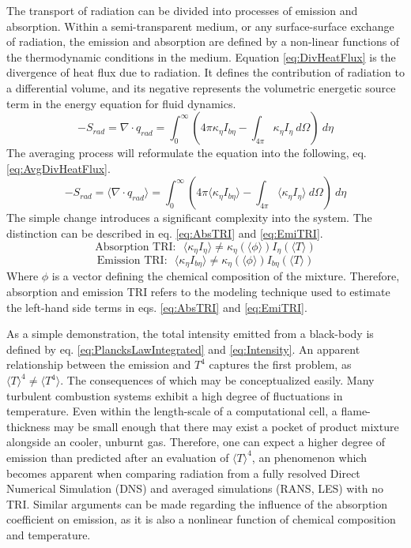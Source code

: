 The transport of radiation can be divided into processes of emission and absorption. 
Within a semi-transparent medium, or any surface-surface exchange of radiation, the emission and absorption are defined by a non-linear functions of the thermodynamic conditions in the medium.
Equation \ref{eq:DivHeatFlux} is the divergence of heat flux due to radiation. It defines the contribution of radiation to a differential volume, and its negative represents the volumetric energetic source term in the energy equation for fluid dynamics.
\begin{equation}
    -S_{rad}=\nabla\cdot{}q_{rad} = \int_0^\infty{\left(4\pi{}\kappa_\eta{}I_{b\eta{}}-\int_{4\pi}{\kappa{}_\eta{}I_\eta{}~d\Omega{}}\right)~d\eta{}}
    \label{eq:DivHeatFlux}
\end{equation}
The averaging process will reformulate the equation into the following, eq. \ref{eq:AvgDivHeatFlux}.
\begin{equation}
    -S_{rad}=\langle\nabla\cdot{}q_{rad}\rangle = \int_0^\infty{\left(4\pi{}\langle\kappa_\eta{}I_{b\eta{}}\rangle-\int_{4\pi}{\langle\kappa{}_\eta{}I_\eta{}\rangle~d\Omega{}}\right)~d\eta{}}
    \label{eq:AvgDivHeatFlux}
\end{equation}
The simple change introduces a significant complexity into the system. The distinction can be described in eq. \ref{eq:AbsTRI} and \ref{eq:EmiTRI}.
\begin{equation}
    \text{Absorption TRI:~~}\langle\kappa_\eta{}I_{\eta}\rangle \neq \kappa_\eta{}(\langle\phi{}\rangle) I_{\eta}(\langle{}T\rangle{})
    \label{eq:AbsTRI}
\end{equation}
\begin{equation}
    \text{Emission TRI:~~}\langle\kappa_\eta{}I_{b\eta}\rangle \neq \kappa_\eta{}(\langle\phi{}\rangle) I_{b\eta}(\langle{}T\rangle{})
    \label{eq:EmiTRI}
\end{equation}
Where $\phi{}$ is a vector defining the chemical composition of the mixture. Therefore, absorption and emission TRI refers to the modeling technique used to estimate the left-hand side terms in eqs. \ref{eq:AbsTRI} and \ref{eq:EmiTRI}.

As a simple demonstration, the total intensity emitted from a black-body is defined by eq. \ref{eq:PlancksLawIntegrated} and \ref{eq:Intensity}.
An apparent relationship between the emission and $T^4$ captures the first problem, as $\langle{T}\rangle^4 \neq \langle{}T^4\rangle$. 
The consequences of which may be conceptualized easily. Many turbulent combustion systems exhibit a high degree of fluctuations in temperature. Even within the length-scale of a computational cell, a flame-thickness may be small enough that there may exist a pocket of product mixture alongside an cooler, unburnt gas.
Therefore, one can expect a higher degree of emission than predicted after an evaluation of $\langle{T}\rangle^4$, an phenomenon which becomes apparent when comparing radiation from a fully resolved Direct Numerical Simulation (DNS) and averaged simulations (RANS, LES) with no TRI.
Similar arguments can be made regarding the influence of the absorption coefficient on emission, as it is also a nonlinear function of chemical composition and temperature.

